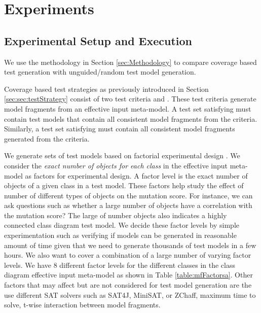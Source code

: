 \section{Experiments}
\label{sec:Experiments}



\subsection{Experimental Setup and Execution}
\label{sec:sec:experiments}

We use the methodology in Section \ref{sec:Methodology} to compare coverage based test generation with unguided/random test model generation. 

Coverage based test strategies as previously introduced in Section \ref{sec:sec:testStrategy} consist of two test criteria {\AllRanges} and {\AllPartitions}.  These test criteria generate model fragments from an effective input meta-model. A test set satisfying {\AllRanges} must contain test models that contain all consistent model fragments from the {\AllRanges} criteria. Similarly, a test set satisfying {\AllPartitions} must contain all consistent model fragments generated from the {\AllPartitions} criteria.

We generate sets of test models based on factorial experimental design \cite{shari2005}. We consider the \emph{exact number of objects for each class} in the effective input meta-model as factors for experimental design. A factor level is the exact number of objects of a given class in a test model. These factors help study the effect of number of different types of objects on the mutation score. For instance, we can ask questions such as whether a large number of {\Association} objects have a correlation with the mutation score? The large of number {\Association} objects also indicates a highly connected {\UML} class diagram test model. We decide these factor levels by simple experimentation such as verifying if models can be generated in reasonable amount of time given that we need to generate thousands of test models in a few hours. We also want to cover a combination of a large number of varying factor levels. We have 8 different factor levels for the different classes in the {\UML} class diagram effective input meta-model as shown in Table \ref{table:mfFactorsa}. Other factors that may affect but are not considered for test model generation are the use different SAT solvers such as SAT4J, MiniSAT, or ZChaff, maximum time to solve, t-wise interaction between model fragments.

